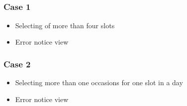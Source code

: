 \documentclass[letterpaper,10pt,english]{sphinxmanual}
\begin{document}


\subsection{}
\label{\detokenize{user_manual:anamolies-management}}

\subsubsection{Case 1}
\label{\detokenize{user_manual:case-1}}\begin{itemize}
\item {} 
Selecting of more than four slots

\end{itemize}

\begin{itemize}
\item {} 
Error notice view

\end{itemize}



\subsubsection{Case 2}
\label{\detokenize{user_manual:case-2}}\begin{itemize}
\item {} 
Selecting more than one occasions for one slot in a day

\end{itemize}

\begin{itemize}
\item {} 
Error notice view

\end{itemize}
\end{document}
